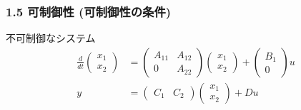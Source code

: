 \documentclass[10pt]{beamer}
\begin{document}
\begin{frame}[t]
\frametitle{1.5 可制御性 (可制御性の条件)}
不可制御なシステム
\begin{align}
 \frac{d}{dt}
  \left(\begin{array}{c}
         {x}_1 \\
   {x}_2
  \end{array}\right)
  &=
  \left(\begin{array}{cc}
         {A}_{11} & {A}_{12} \\
       0        & {A}_{22}
  \end{array}\right)
  \left(\begin{array}{c}
         {x}_1 \\
   {x}_2
  \end{array}\right)
  +
  \left(\begin{array}{c}
         {B}_1 \\
   0
  \end{array}\right)
  u
\\
 y &=
  \left(\begin{array}{cc}
         {C}_1 & {C}_2
  \end{array}\right)
  \left(\begin{array}{c}
         {x}_1 \\
   {x}_2
  \end{array}\right)
  + D u

\end{align}


\end{frame}
\end{document}
